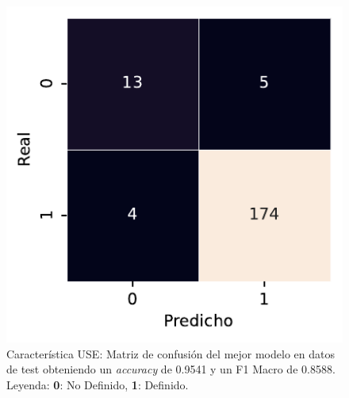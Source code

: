 \begin{figure}[htbp]
    \vspace{1.5em} %

    \includegraphics[width=0.6\linewidth]{figures/5_experiments/multi-use-cm.pdf}
    \caption[Característica USE: Matriz de confusión del mejor modelo en datos de test.]{Característica USE: Matriz de confusión del mejor modelo en datos de test obteniendo un \textit{accuracy} de 0.9541 y un F1 Macro de 0.8588. Leyenda: \textbf{0}: No Definido, \textbf{1}: Definido.}
    \label{fig5:USE_confusion_matrix}
\end{figure}

